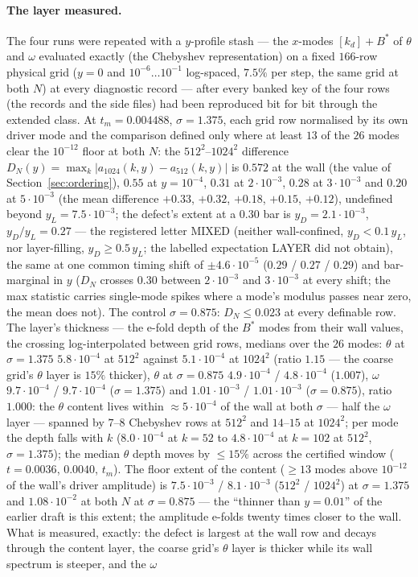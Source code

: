 \documentclass[11pt,a4paper]{article}
\newcommand{\abs}[1]{\lvert #1 \rvert}
\newcommand{\kd}{k_d}
\newcommand{\tm}{t_m}
\newcommand{\Bst}{B^*}
\begin{document}
\paragraph{The layer measured.} The four runs were repeated with a $y$-profile stash --- the $x$-modes $[\kd]+\Bst$ of $\theta$ and $\omega$ evaluated exactly (the Chebyshev representation) on a fixed $166$-row physical grid ($y=0$ and $10^{-6}\dots10^{-1}$ log-spaced, $7.5\%$ per step, the same grid at both $N$) at every diagnostic record --- after every banked key of the four rows (the records and the side files) had been reproduced bit for bit through the extended class. At $\tm=0.004488$, $\sigma=1.375$, each grid row normalised by its own driver mode and the comparison defined only where at least $13$ of the $26$ modes clear the $10^{-12}$ floor at both $N$: the $512^2$--$1024^2$ difference $D_N(y)=\max_k\abs{a_{1024}(k,y)-a_{512}(k,y)}$ is $0.572$ at the wall (the value of Section~\ref{sec:ordering}), $0.55$ at $y=10^{-4}$, $0.31$ at $2\cdot10^{-3}$, $0.28$ at $3\cdot10^{-3}$ and $0.20$ at $5\cdot10^{-3}$ (the mean difference $+0.33$, $+0.32$, $+0.18$, $+0.15$, $+0.12$), undefined beyond $y_L=7.5\cdot10^{-3}$; the defect's extent at a $0.30$ bar is $y_D=2.1\cdot10^{-3}$, $y_D/y_L=0.27$ --- the registered letter MIXED (neither wall-confined, $y_D<0.1\,y_L$, nor layer-filling, $y_D\ge0.5\,y_L$; the labelled expectation LAYER did not obtain), the same at one common timing shift of $\pm4.6\cdot10^{-5}$ ($0.29$ / $0.27$ / $0.29$) and bar-marginal in $y$ ($D_N$ crosses $0.30$ between $2\cdot10^{-3}$ and $3\cdot10^{-3}$ at every shift; the max statistic carries single-mode spikes where a mode's modulus passes near zero, the mean does not). The control $\sigma=0.875$: $D_N\le0.023$ at every definable row. The layer's thickness --- the e-fold depth of the $\Bst$ modes from their wall values, the crossing log-interpolated between grid rows, medians over the $26$ modes: $\theta$ at $\sigma=1.375$ $5.8\cdot10^{-4}$ at $512^2$ against $5.1\cdot10^{-4}$ at $1024^2$ (ratio $1.15$ --- the coarse grid's $\theta$ layer is $15\%$ thicker), $\theta$ at $\sigma=0.875$ $4.9\cdot10^{-4}$ / $4.8\cdot10^{-4}$ ($1.007$), $\omega$ $9.7\cdot10^{-4}$ / $9.7\cdot10^{-4}$ ($\sigma=1.375$) and $1.01\cdot10^{-3}$ / $1.01\cdot10^{-3}$ ($\sigma=0.875$), ratio $1.000$: the $\theta$ content lives within $\approx5\cdot10^{-4}$ of the wall at both $\sigma$ --- half the $\omega$ layer --- spanned by $7$--$8$ Chebyshev rows at $512^2$ and $14$--$15$ at $1024^2$; per mode the depth falls with $k$ ($8.0\cdot10^{-4}$ at $k=52$ to $4.8\cdot10^{-4}$ at $k=102$ at $512^2$, $\sigma=1.375$); the median $\theta$ depth moves by $\le15\%$ across the certified window ($t=0.0036$, $0.0040$, $\tm$). The floor extent of the content ($\ge13$ modes above $10^{-12}$ of the wall's driver amplitude) is $7.5\cdot10^{-3}$ / $8.1\cdot10^{-3}$ ($512^2$ / $1024^2$) at $\sigma=1.375$ and $1.08\cdot10^{-2}$ at both $N$ at $\sigma=0.875$ --- the ``thinner than $y=0.01$'' of the earlier draft is this extent; the amplitude e-folds twenty times closer to the wall. What is measured, exactly: the defect is largest at the wall row and decays through the content layer, the coarse grid's $\theta$ layer is thicker while its wall spectrum is steeper, and the $\omega$ 
\end{document}
